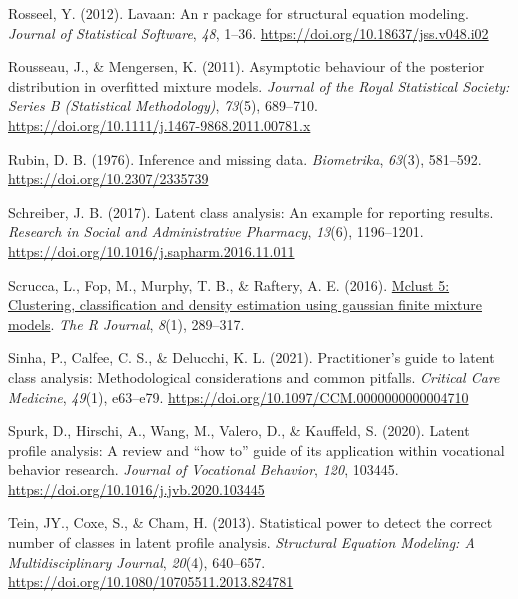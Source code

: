 \documentclass[
  ,man,floatsintext]{apa6}
\newlength{\cslhangindent}
\newlength{\cslentryspacingunit} %
\newenvironment{CSLReferences}[2] %
 {%
  \setlength{\parindent}{0pt}
  \ifodd #1
  \let\oldpar\par
  \def\par{\hangindent=\cslhangindent\oldpar}
  \fi
  \setlength{\parskip}{#2\cslentryspacingunit}
 }%
 {}
\begin{document}
\begin{CSLReferences}{1}{0}
\leavevmode{}%
Rosseel, Y. (2012). Lavaan: An r package for structural equation modeling. \emph{Journal of Statistical Software}, \emph{48}, 1--36. \url{https://doi.org/10.18637/jss.v048.i02}

\leavevmode{}%
Rousseau, J., \& Mengersen, K. (2011). Asymptotic behaviour of the posterior distribution in overfitted mixture models. \emph{Journal of the Royal Statistical Society: Series B (Statistical Methodology)}, \emph{73}(5), 689--710. \url{https://doi.org/10.1111/j.1467-9868.2011.00781.x}

\leavevmode{}%
Rubin, D. B. (1976). Inference and missing data. \emph{Biometrika}, \emph{63}(3), 581--592. \url{https://doi.org/10.2307/2335739}

\leavevmode{}%
Schreiber, J. B. (2017). Latent class analysis: An example for reporting results. \emph{Research in Social and Administrative Pharmacy}, \emph{13}(6), 1196--1201. \url{https://doi.org/10.1016/j.sapharm.2016.11.011}

\leavevmode{}%
Scrucca, L., Fop, M., Murphy, T. B., \& Raftery, A. E. (2016). \href{https://www.ncbi.nlm.nih.gov/pmc/articles/PMC5096736}{Mclust 5: Clustering, classification and density estimation using gaussian finite mixture models}. \emph{The R Journal}, \emph{8}(1), 289--317.

\leavevmode{}%
Sinha, P., Calfee, C. S., \& Delucchi, K. L. (2021). Practitioner's guide to latent class analysis: Methodological considerations and common pitfalls. \emph{Critical Care Medicine}, \emph{49}(1), e63--e79. \url{https://doi.org/10.1097/CCM.0000000000004710}

\leavevmode{}%
Spurk, D., Hirschi, A., Wang, M., Valero, D., \& Kauffeld, S. (2020). Latent profile analysis: A review and {``how to''} guide of its application within vocational behavior research. \emph{Journal of Vocational Behavior}, \emph{120}, 103445. \url{https://doi.org/10.1016/j.jvb.2020.103445}

\leavevmode{}%
Tein, JY., Coxe, S., \& Cham, H. (2013). Statistical power to detect the correct number of classes in latent profile analysis. \emph{Structural Equation Modeling: A Multidisciplinary Journal}, \emph{20}(4), 640--657. \url{https://doi.org/10.1080/10705511.2013.824781}


\end{CSLReferences}
\end{document}
